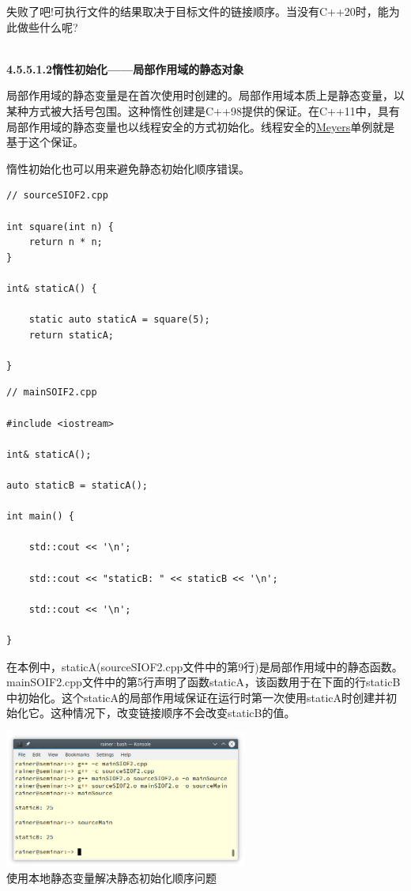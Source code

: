 失败了吧!可执行文件的结果取决于目标文件的链接顺序。当没有C++20时，能为此做些什么呢?

\hspace*{\fill} \\ %
\noindent
\textbf{4.5.5.1.2\hspace{0.2cm}惰性初始化——局部作用域的静态对象}

局部作用域的静态变量是在首次使用时创建的。局部作用域本质上是静态变量，以某种方式被大括号包围。这种惰性创建是C++98提供的保证。在C++11中，具有局部作用域的静态变量也以线程安全的方式初始化。线程安全的\href{https://en.wikipedia.org/wiki/Scott_Meyers}{Meyers}单例就是基于这个保证。

惰性初始化也可以用来避免静态初始化顺序错误。

\begin{lstlisting}[style=styleCXX]
// sourceSIOF2.cpp

int square(int n) {
	return n * n;
}

int& staticA() {
	
	static auto staticA = square(5);
	return staticA;

}
\end{lstlisting}

\begin{lstlisting}[style=styleCXX]
// mainSOIF2.cpp

#include <iostream>

int& staticA();

auto staticB = staticA();

int main() {
	
	std::cout << '\n';
	
	std::cout << "staticB: " << staticB << '\n';
	
	std::cout << '\n';

}
\end{lstlisting}

在本例中，staticA(sourceSIOF2.cpp文件中的第9行)是局部作用域中的静态函数。mainSOIF2.cpp文件中的第5行声明了函数staticA，该函数用于在下面的行staticB中初始化。这个staticA的局部作用域保证在运行时第一次使用staticA时创建并初始化它。这种情况下，改变链接顺序不会改变staticB的值。

\begin{center}
\includegraphics[width=0.6\textwidth]{content/3/chapter4/images/38.png}\\
使用本地静态变量解决静态初始化顺序问题
\end{center}

